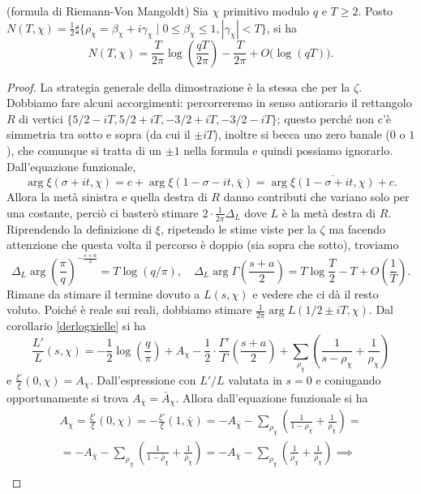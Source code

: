 \begin{prop}
  (formula di Riemann-Von Mangoldt) Sia $\chi$ primitivo modulo $q$ e $T \ge 2$. Posto $N(T,\chi)=\frac{1}{2}\sharp\{\rho_\chi=\beta_\chi+i\gamma_\chi \mid 0 \le \beta_\chi \le 1, |\gamma_\chi|<T\}$, si ha
  $$N(T,\chi)=\frac{T}{2\pi}\log\left(\frac{qT}{2\pi}\right)-\frac{T}{2\pi}+O\big(\log(qT)\big).$$
\end{prop}

\begin{proof}
  La strategia generale della dimostrazione è la stessa che per la $\zeta$. Dobbiamo fare alcuni accorgimenti: percorreremo in senso antiorario il rettangolo $R$ di vertici $\{5/2-iT,5/2+iT, -3/2+iT, -3/2-iT\}$; questo perché non c'è simmetria tra sotto e sopra (da cui il $\pm iT$), inoltre si becca uno zero banale ($0$ o $1$), che comunque si tratta di un $\pm 1$ nella formula e quindi possiamo ignorarlo. Dall'equazione funzionale,
  $$\arg\xi(\sigma+it,\chi)=c+\arg\xi(1-\sigma-it,\bar{\chi})=\arg\overline{\xi(1-\sigma+it,\chi)}+c.$$
  Allora la metà sinistra e quella destra di $R$ danno contributi che variano solo per una costante, perciò ci basterò stimare $2\cdot\frac{1}{2\pi}\Delta_L$ dove $L$ è la metà destra di $R$. Riprendendo la definizione di $\xi$, ripetendo le stime viste per la $\zeta$ ma facendo attenzione che questa volta il percorso è doppio (sia sopra che sotto), troviamo
  $$\Delta_L \arg\left(\frac{\pi}{q}\right)^{-\frac{s+a}{2}}=T\log(q/\pi), \quad \Delta_L\arg\Gamma\left(\frac{s+a}{2}\right)=T\log\frac{T}{2}-T+O\left(\frac{1}{T}\right).$$
  Rimane da stimare il termine dovuto a $L(s,\chi)$ e vedere che ci dà il resto voluto. Poiché è reale sui reali, dobbiamo stimare $\frac{1}{2\pi}\arg L(1/2\pm iT,\chi)$. Dal corollario \ref{derlogxielle} si ha
  $$\frac{L'}{L}(s,\chi)=-\frac{1}{2}\log\left(\frac{q}{\pi}\right)+A_\chi-\frac{1}{2}\cdot\frac{\Gamma'}{\Gamma}\left(\frac{s+a}{2}\right)+\sum_{\rho_\chi} \left(\frac{1}{s-\rho_\chi}+\frac{1}{\rho_\chi}\right)$$
  e $\frac{\xi'}{\xi}(0,\chi)=A_\chi$. Dall'espressione con $L'/L$ valutata in $s=0$ e coniugando opportunamente si trova $A_{\bar{\chi}}=\bar{A}_\chi$. Allora dall'equazione funzionale si ha
  \begin{gather*}
    A_\chi=\frac{\xi'}{\xi}(0,\chi)=-\frac{\xi'}{\xi}(1,\bar{\chi})=-A_{\bar{\chi}}-\sum_{\rho_{\bar{\chi}}} \left(\frac{1}{1-\rho_{\bar{\chi}}}+\frac{1}{\rho_{\bar{\chi}}}\right)= \\
    =-A_{\bar{\chi}}-\sum_{\rho_\chi}\left(\frac{1}{1-\bar{\rho}_\chi}+\frac{1}{\bar{\rho}_\chi}\right)=-A_{\bar{\chi}}-\sum_{\rho_\chi}\left(\frac{1}{\rho_\chi}+\frac{1}{\bar{\rho}_\chi}\right) \implies \\

\end{gather*}
\end{proof}
